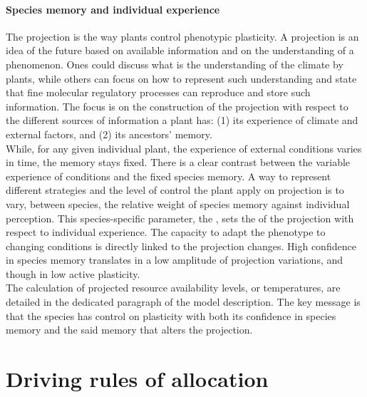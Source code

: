 \paragraph{Species memory and individual experience}
The projection is the way plants control phenotypic plasticity. A projection is an idea of the future based on available information and on the understanding of a phenomenon. Ones could discuss what is the understanding of the climate by plants, while others can focus on how to represent such understanding and state that fine molecular regulatory processes can reproduce and store such information. The focus is on the construction of the projection with respect to the different sources of information a plant has: (1) its experience of climate and external factors, and (2) its ancestors' memory.\\
While, for any given individual plant, the experience of external conditions varies in time, the memory stays fixed. There is a clear contrast between the variable experience of conditions and the fixed species memory. A way to represent different strategies and the level of control the plant apply on projection is to vary, between species, the relative weight of species memory against individual perception. This species-specific parameter, the , sets the  of the projection with respect to individual experience. The capacity to adapt the phenotype to changing conditions is directly linked to the projection changes. High confidence in species memory translates in a low amplitude of projection variations, and though in low active plasticity.\\
The calculation of projected resource availability levels, or temperatures, are detailed in the dedicated paragraph of the model description. The key message is that the species has control on plasticity with both its confidence in species memory and the said memory that alters the projection. %



\section{Driving rules of allocation}\label{section:allocation-rule}


